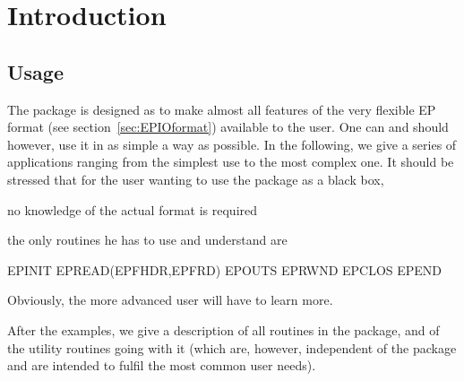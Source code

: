  
\chapter{Introduction}
\label{sec:H1introduction}

\section{Usage}
 
The package is designed as to make almost all features of the very
flexible EP format (see section~\ref{sec:EPIOformat}) 
available to the user. One can and
should however, use it in as simple a way as possible. In the following,
we give a series of applications ranging from the simplest use to the
most complex one. It should be stressed that for the user wanting to use
the package as a black box,

\begin{UL}
\item no knowledge of the actual format is required
\item the only routines he has to use and understand are
\end{UL}

\begin{XMP}
          EPINIT
          EPREAD(EPFHDR,EPFRD)
          EPOUTS
          EPRWND
          EPCLOS
          EPEND
\end{XMP}
 
Obviously, the more advanced user will have to learn more.
 
After the examples, we give a description of all routines in the
package, and of the utility routines going with it (which are,
however, independent of the package and are intended to fulfil the most
common user needs).
 

